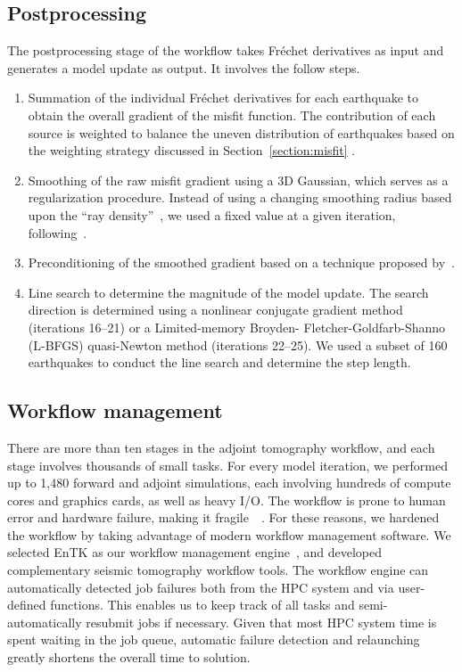 \documentclass[extra,mreferee]{gji}
\begin{document}
\subsection{Postprocessing}

The postprocessing stage of the workflow takes Fr\'echet derivatives as input and
generates a model update as output.
It involves the follow steps.
\begin{enumerate}
  \item Summation of the individual Fr\'echet derivatives for each earthquake to obtain the overall gradient of the misfit function. The contribution of each source is weighted to balance
    the uneven distribution of earthquakes based on the weighting strategy discussed in Section~\ref{section:misfit} .
  \item Smoothing of the raw misfit gradient using a 3D Gaussian, which
    serves as a regularization procedure. Instead of using a changing
    smoothing radius based upon the ``ray density''~\citep{bozdaug2016global},
    we used a fixed value at a given iteration, following~\cite{zhu2012structure}.
  \item Preconditioning of the smoothed gradient based on a technique proposed by~\cite{luo2013strategies}.
  \item Line search to determine the magnitude of the model update.
  The search direction is determined using a nonlinear conjugate gradient method~\citep{wright1999numerical} (iterations 16--21) or a Limited-memory Broyden- Fletcher-Goldfarb-Shanno (L-BFGS) quasi-Newton method (iterations 22--25).
  We used a subset of 160 earthquakes to conduct the line search and determine the step length.
\end{enumerate}

\subsection{Workflow management}

There are more than ten stages in the adjoint tomography workflow,
and each stage involves thousands of small tasks.
For every model iteration,
we performed up to 1,480 forward and adjoint simulations, each involving hundreds of
compute cores and graphics cards, as well as heavy I/O.
The workflow is prone to human error and hardware failure, making it fragile~~\citep{Lefebvre2018}.
For these reasons, we hardened the workflow by taking advantage of modern
workflow management software.
We selected EnTK as our
workflow management engine~\citep{EnTK2017}, and developed complementary seismic tomography
workflow tools.
The workflow engine can automatically detected job failures both from the
HPC system and via user-defined functions. This enables us to keep track of
all tasks and semi-automatically resubmit jobs if necessary.
Given that most HPC system time is spent waiting in the job queue, automatic
failure detection and relaunching greatly shortens the overall time to solution.
\end{document}
